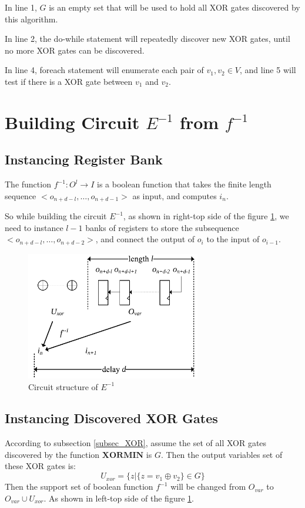 \documentclass[journal]{IEEEtran}
\begin{document}
In line 1,
$G$ is an empty set that will be used to hold all XOR gates discovered by this algorithm.

In line 2, the do-while statement will repeatedly discover new XOR gates,
until no more XOR gates can be discovered.

In line 4,
foreach statement will enumerate each pair of $v_1,v_2\in V$,
and line 5 will test if there is a XOR gate between $v_1$ and $v_2$.


\section{Building Circuit $E^{-1}$ from $f^{-1}$}\label{sec_build}
\subsection{Instancing Register Bank}
The function $f^{-1}:O^l\to I$ is a boolean function that takes the finite length sequence $<o_{n+d-l},\dots , o_{n+d-1} >$ as input,
and computes $i_n$.

So while building the circuit $E^{-1}$,
as shown in right-top side of the figure \ref{reg_bank},
we need to instance $l-1$ banks of registers to store the subsequence $<o_{n+d-l},\dots , o_{n+d-2} >$,
and connect the output of $o_i$ to the input of $o_{i-1}$.

\begin{figure}[!t]
\centering
\includegraphics[width=3in]{reg_bank}
\caption{Circuit structure of $E^{-1}$}
\label{reg_bank}
\end{figure}

\subsection{Instancing Discovered XOR Gates}\label{subsec_insxor}
According to subsection \ref{subsec_XOR},
assume the set of all XOR gates discovered by the function $\boldsymbol{XORMIN}$ is $G$.
Then the output variables set of these XOR gates is:
\begin{equation}
U_{xor}=\Big\{z|\{z=v_1\oplus v_2\}\in G\Big\}
\end{equation}
Then the support set of boolean function $f^{-1}$ will be changed from $O_{var}$ to $O_{var}\cup U_{xor}$.
As shown in left-top side of the figure \ref{reg_bank}.
\end{document}
